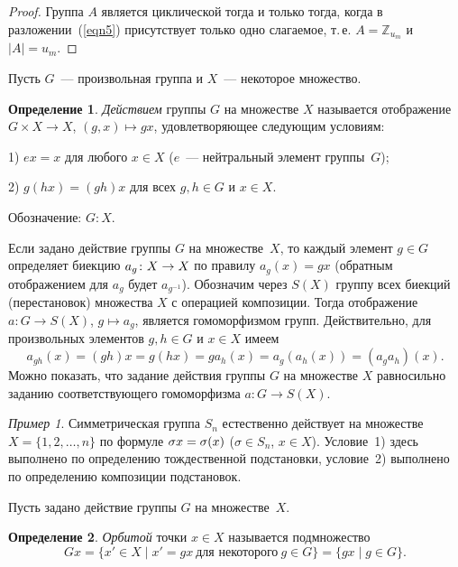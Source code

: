 \documentclass[a4paper,10pt]{amsart}
\def\ZZ{{\mathbb Z}}%
\theoremstyle{definition}
\newtheorem{definition}{Определение}
\theoremstyle{remark}
\newtheorem{example}{Пример}
\begin{document}
\begin{proof}
Группа $A$ является циклической тогда и только тогда, когда в
разложении~(\ref{eqn5}) присутствует только одно слагаемое, т.\,е.
$A = \ZZ_{u_m}$ и $|A| = u_m$.
\end{proof}


Пусть $G$~--- произвольная группа и $X$~--- некоторое множество.

\begin{definition}
\textit{Действием} группы $G$ на множестве $X$ называется
отображение $G\times X\to X$, $(g,x)\mapsto gx$, удовлетворяющее
следующим условиям:

1) $ex=x$ для любого $x\in X$ ($e$~--- нейтральный элемент
группы~$G$);

2) $g(hx)=(gh)x$ для всех $g,h\in G$ и $x\in X$.

Обозначение: $G:X$.
\end{definition}

Если задано действие группы $G$ на множестве~$X$, то каждый элемент
$g \in G$ определяет биекцию $a_g \colon X \to\nobreak X$ по правилу
$a_g(x) = gx$ (обратным отображением для $a_g$ будет $a_{g^{-1}}$).
Обозначим через $S(X)$ группу всех биекций (перестановок) множества
$X$ с операцией композиции. Тогда отображение $a \colon G \to S(X)$,
$g \mapsto a_g$, является гомоморфизмом групп. Действительно, для
произвольных элементов $g,h \in G$ и $x \in X$ имеем
$$
a_{gh}(x) = (gh)x = g(hx) = g a_h(x) = a_g (a_h(x)) = (a_g a_h)(x).
$$
Можно показать, что задание действия группы $G$ на множестве $X$
равносильно заданию соответствующего гомоморфизма $a \colon G \to
S(X)$.

\begin{example}
Симметрическая группа $S_n$ естественно действует на множестве $X =
\lbrace 1, 2, \ldots, n \rbrace$ по формуле $\sigma x =\nobreak
\sigma (x)$ ($\sigma \in S_n$, $x \in X$). Условие~1) здесь
выполнено по определению тождественной подстановки, условие~2)
выполнено по определению композиции подстановок.
\end{example}

Пусть задано действие группы $G$ на множестве~$X$.

\begin{definition}
{\it Орбитой} точки $x\in X$ называется подмножество
$$
Gx = \lbrace x' \in X \mid x' = gx \ \text{для некоторого} \ g \in G
\rbrace = \{ gx \mid g\in G\}.
$$
\end{definition}
\end{document}
